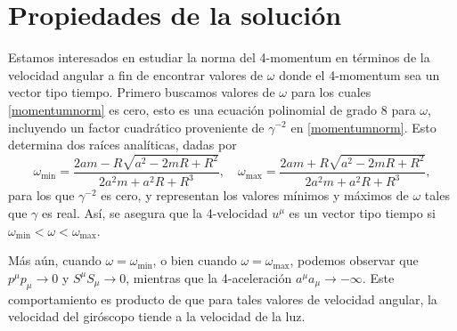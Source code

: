 \section{Propiedades de la solución}

Estamos interesados en estudiar la norma del 4-momentum en términos de la velocidad angular a fin de encontrar valores de $\omega$ donde el 4-momentum sea un vector tipo tiempo. Primero buscamos valores de $\omega$ para los cuales \eqref{momentumnorm} es cero, esto es una ecuación polinomial de grado 8 para $\omega$, incluyendo un factor cuadrático proveniente de $\gamma^{-2}$ en \eqref{momentumnorm}. Esto determina dos raíces analíticas, dadas por
\begin{equation}
\omega_{\mathrm{min}} = \frac{2 a m - R \sqrt{a^{2} - 2 m R + R^{2}}}{2 a^{2} m + a^{2} R + R^{3}}, \quad \omega_{\mathrm{max}} = \frac{2 a m + R \sqrt{a^{2} - 2 m R + R^{2}}}{2 a^{2} m + a^{2} R + R^{3}}, \label{eq:omega}
\end{equation}
para los que $\gamma^{-2}$ es cero, y representan los valores mínimos y máximos de $\omega$ tales que $\gamma$ es real. Así, se asegura que la 4-velocidad $u^{\mu}$ es un vector tipo tiempo si $\omega_{\mathrm{min}} < \omega < \omega_{\mathrm{max}}$.

Más aún, cuando  $ \omega = \omega_ {\mathrm{min}} $, o bien cuando $\omega = \omega_\mathrm{max}$, podemos observar que  $ p^{\mu} p_{\mu} \to 0$ y $S^{\mu} S_{\mu} \to 0 $, mientras que la 4-aceleración $ a^{\mu} a_{\mu} \to - \infty $. Este comportamiento es producto de que para tales valores de velocidad angular, la velocidad del giróscopo tiende a la velocidad de la luz.


